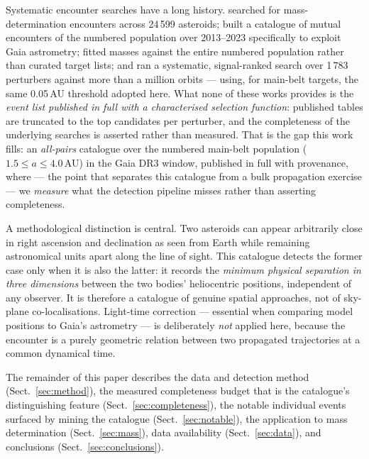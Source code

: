 \documentclass{aa}
\begin{document}
Systematic encounter searches have a long history. \citet{galad2002} searched
for mass-determination encounters across 24\,599 asteroids;
\citet{ivantsov2018} built a catalogue of mutual encounters of the numbered
population over 2013--2023 specifically to exploit Gaia astrometry;
\citet{goffin2014} fitted masses against the entire numbered population rather
than curated target lists; and \citet{fuentesmunoz2025} ran a systematic,
signal-ranked search over 1\,783 perturbers against more than a million
orbits --- using, for main-belt targets, the same 0.05\,AU threshold adopted
here. What none of these works provides is the \emph{event list published in
full with a characterised selection function}: published tables are truncated
to the top candidates per perturber, and the completeness of the underlying
searches is asserted rather than measured. That is the gap this work fills: an
\emph{all-pairs} catalogue over the numbered main-belt population
($1.5 \le a \le 4.0$\,AU) in the Gaia DR3 window, published in full with
provenance, where --- the point that separates this catalogue from a bulk
propagation exercise --- we \emph{measure} what the detection pipeline misses
rather than asserting completeness.

A methodological distinction is central. Two asteroids can appear arbitrarily
close in right ascension and declination as seen from Earth while remaining
astronomical units apart along the line of sight. This catalogue detects the
former case only when it is also the latter: it records the \emph{minimum
physical separation in three dimensions} between the two bodies' heliocentric
positions, independent of any observer. It is therefore a catalogue of genuine
spatial approaches, not of sky-plane co-localisations. Light-time correction
--- essential when comparing model positions to Gaia's astrometry --- is
deliberately \emph{not} applied here, because the encounter is a purely
geometric relation between two propagated trajectories at a common dynamical
time.

The remainder of this paper describes the data and detection method
(Sect.~\ref{sec:method}), the measured completeness budget that is the
catalogue's distinguishing feature (Sect.~\ref{sec:completeness}), the notable
individual events surfaced by mining the catalogue (Sect.~\ref{sec:notable}),
the application to mass determination (Sect.~\ref{sec:mass}), data availability
(Sect.~\ref{sec:data}), and conclusions (Sect.~\ref{sec:conclusions}).

\end{document}
